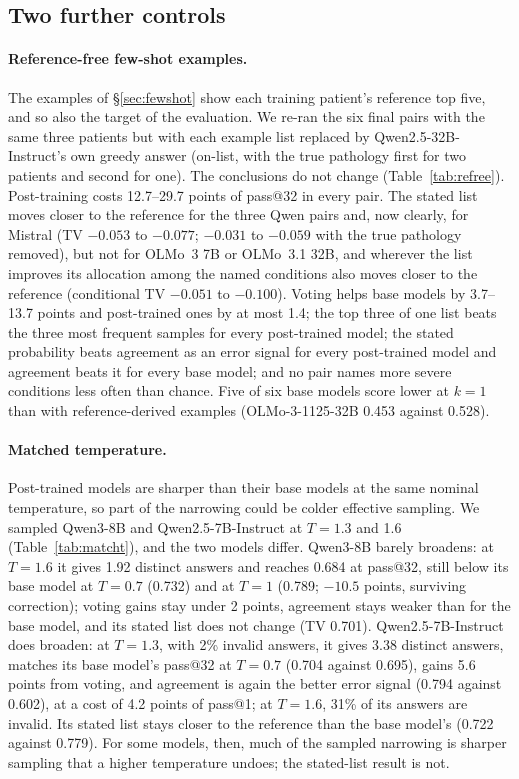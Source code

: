 \documentclass[11pt]{article}
\begin{document}
\subsection{Two further controls}\label{sec:controls}
\paragraph{Reference-free few-shot examples.} The examples of \S\ref{sec:fewshot} show each training patient's reference top five, and so also the target of the evaluation. We re-ran the six final pairs with the same three patients but with each example list replaced by Qwen2.5-32B-Instruct's own greedy answer (on-list, with the true pathology first for two patients and second for one). The conclusions do not change (Table~\ref{tab:refree}). Post-training costs 12.7--29.7 points of pass@32 in every pair. The stated list moves closer to the reference for the three Qwen pairs and, now clearly, for Mistral (TV $-0.053$ to $-0.077$; $-0.031$ to $-0.059$ with the true pathology removed), but not for OLMo~3 7B or OLMo~3.1 32B, and wherever the list improves its allocation among the named conditions also moves closer to the reference (conditional TV $-0.051$ to $-0.100$). Voting helps base models by 3.7--13.7 points and post-trained ones by at most 1.4; the top three of one list beats the three most frequent samples for every post-trained model; the stated probability beats agreement as an error signal for every post-trained model and agreement beats it for every base model; and no pair names more severe conditions less often than chance. Five of six base models score lower at $k{=}1$ than with reference-derived examples (OLMo-3-1125-32B 0.453 against 0.528).

\paragraph{Matched temperature.} Post-trained models are sharper than their base models at the same nominal temperature, so part of the narrowing could be colder effective sampling. We sampled Qwen3-8B and Qwen2.5-7B-Instruct at $T{=}1.3$ and 1.6 (Table~\ref{tab:matcht}), and the two models differ. Qwen3-8B barely broadens: at $T{=}1.6$ it gives 1.92 distinct answers and reaches 0.684 at pass@32, still below its base model at $T{=}0.7$ (0.732) and at $T{=}1$ (0.789; $-10.5$ points, surviving correction); voting gains stay under 2 points, agreement stays weaker than for the base model, and its stated list does not change (TV 0.701). Qwen2.5-7B-Instruct does broaden: at $T{=}1.3$, with 2\% invalid answers, it gives 3.38 distinct answers, matches its base model's pass@32 at $T{=}0.7$ (0.704 against 0.695), gains 5.6 points from voting, and agreement is again the better error signal (0.794 against 0.602), at a cost of 4.2 points of pass@1; at $T{=}1.6$, 31\% of its answers are invalid. Its stated list stays closer to the reference than the base model's (0.722 against 0.779). For some models, then, much of the sampled narrowing is sharper sampling that a higher temperature undoes; the stated-list result is not.
\end{document}
